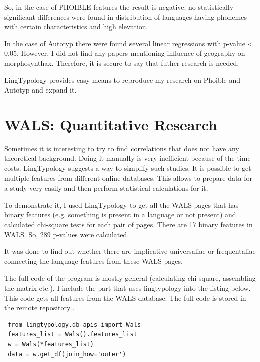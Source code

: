 \documentclass[a4paper,12pt]{article}
\begin{document}
So, in the case of PHOIBLE features the result is negative: no statistically significant differences were found in distribution of languages having phonemes with certain characteristics and high elevation.

In the case of Autotyp there were found several linear regressions with p-value < 0.05. However, I did not find any papers mentioning influence of geography on morphosynthax. Therefore, it is secure to say that futher research is needed.

LingTypology provides easy means to reproduce my research on Phoible and Autotyp and expand it.
\newpage

\section{WALS: Quantitative Research}

Sometimes it is interesting to try to find correlations that does not have any theoretical background. Doing it manually is very inefficient because of the time costs. LingTypology suggests a way to simplify such studies. It is possible to get multiple features from different online databases. This allows to prepare data for a study very easily and then perform statistical calculations for it.

To demonstrate it, I used LingTypology to get all the WALS pages that has binary features (e.g. something is present in a language or not present) and calculated chi-square tests for each pair of pages. There are 17 binary features in WALS. So, 289 p-values were calculated.

It was done to find out whether there are implicative universaliae or frequentaliae connecting the language features from these WALS pages.

The full code of the program is mostly general (calculating chi-square, assembling the matrix etc.). I include the part that uses lingtypology into the listing below. This code gets all features from the WALS database. The full code is stored in the remote repository \parencite[WALS: Quantitative Research.ipynb]{lingtypologyResearch}.
\bigskip

\noindent
\begin{minipage}{\textwidth}
\begin{lstlisting}
 from lingtypology.db_apis import Wals
 features_list = Wals().features_list
 w = Wals(*features_list)
 data = w.get_df(join_how='outer')
\end{lstlisting}
\end{minipage}
\bigskip
\end{document}
